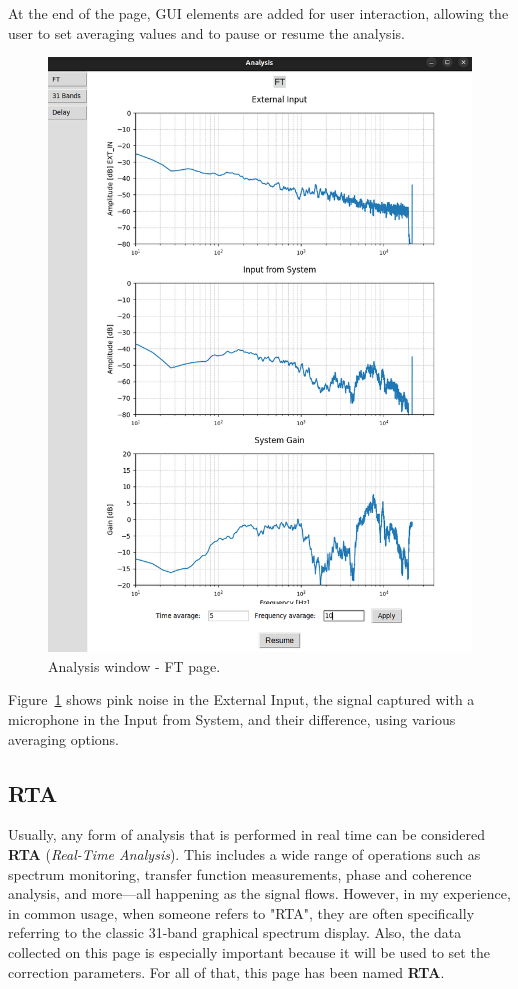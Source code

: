 At the end of the page, GUI elements are added for user interaction, allowing the user to set averaging values and to pause or resume the analysis.

\begin{figure}[H]
	\centering
	\includegraphics[width=0.7
	\linewidth]{Figures/FT_page.png}
	\caption{Analysis window - FT page.}
	\label{fig:FT Page}
\end{figure}

Figure~\ref{fig:FT Page} shows pink noise in the External Input, the signal captured with a microphone in the Input from System, and their difference, using various averaging options.



\subsection{RTA}

Usually, any form of analysis that is performed in real time can be considered \textbf{RTA} (\textit{Real-Time Analysis}). This includes a wide range of operations such as spectrum monitoring, transfer function measurements, phase and coherence analysis, and more—all happening as the signal flows. However, in my experience, in common usage, when someone refers to "RTA", they are often specifically referring to the classic 31-band graphical spectrum display. Also, the data collected on this page is especially important because it will be used to set the correction parameters. For all of that, this page has been named \textbf{RTA}.



